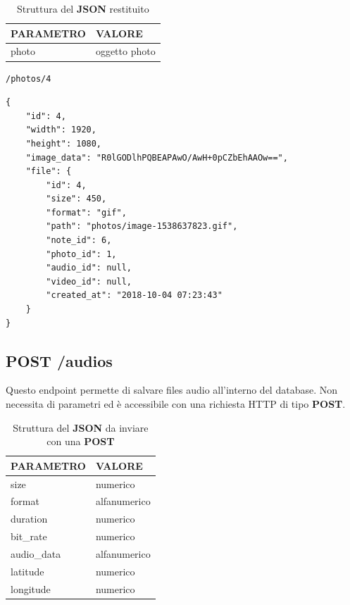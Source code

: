 \begin{table}[!h]
	\centering
	\begin{tabular}{@{}ll@{}}
		\toprule
		\textbf{PARAMETRO} & \textbf{VALORE}  \\ \midrule
		photo              & oggetto photo \\ \bottomrule
	\end{tabular}
\caption{Struttura del \textbf{JSON} restituito}
\end{table}

\begin{lstlisting}[caption=Esempio di chiamata, xleftmargin=.30\textwidth, xrightmargin=.30\textwidth]
	/photos/4
\end{lstlisting}

\begin{lstlisting}[caption=Esempio \textbf{JSON} restituito]
{
	"id": 4,
	"width": 1920,
	"height": 1080,
	"image_data": "R0lGODlhPQBEAPAwO/AwH+0pCZbEhAAOw==",
	"file": {
		"id": 4,
		"size": 450,
		"format": "gif",
		"path": "photos/image-1538637823.gif",
		"note_id": 6,
		"photo_id": 1,
		"audio_id": null,
		"video_id": null,
		"created_at": "2018-10-04 07:23:43"
	}
}
\end{lstlisting}


\subsection{POST /audios}
Questo endpoint permette di salvare files audio all'interno del database. Non necessita di parametri ed è accessibile con una richiesta HTTP di tipo \textbf{POST}.

\begin{table}[!h]
	\centering
	\begin{tabular}{@{}ll@{}}
		\toprule
		\textbf{PARAMETRO} & \textbf{VALORE}  \\ \midrule
		size               & numerico\\ 
		format             & alfanumerico\\
		duration           & numerico\\
		bit\_rate          & numerico\\
		audio\_data        & alfanumerico\\
		latitude           & numerico\\ 
		longitude          & numerico\\ \bottomrule		
	\end{tabular}
\caption{Struttura del \textbf{JSON} da inviare con una \textbf{POST}}
\end{table}

